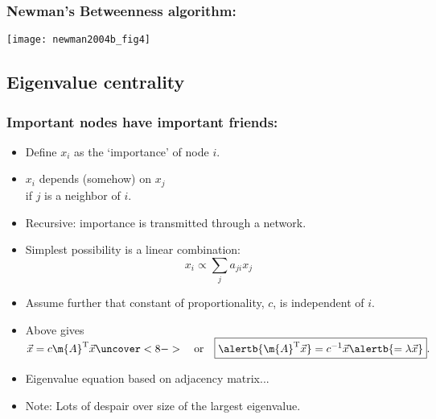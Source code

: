 \begin{frame}
  \frametitle{Newman's Betweenness algorithm:\cite{newman2001d}}

  \texttt{[image: newman2004b\_fig4]}
  
\end{frame}

\subsection{Eigenvalue centrality}

\begin{frame}
  \frametitle{Important nodes have important friends:}

  \begin{itemize}
  \item<2-> 
    Define $x_i$ as the `importance' of node $i$.
  \item<3-> 
     $x_i$ depends (somehow) on $x_j$\\
    \qquad if $j$ is a neighbor of $i$.
  \item<4-> 
    \alert{Recursive:} importance is transmitted
    through a network.
  \item<5-> 
    Simplest possibility is a linear combination:
    $$
    x_i \propto \sum_{j} a_{ji} x_j
    $$
  \item<6-> 
    Assume further that constant of proportionality, $c$,
    is independent of $i$.
  \item<7-> 
    Above gives 
    $
    \vec{x} = c \m{A}^{\textnormal{T}} \vec{x}
    \uncover<8->{
      \quad \textnormal{or} \quad
      \boxed{\alertb{\m{A}^{\textnormal{T}} \vec{x}} = c^{-1} \vec{x} \alertb{= \lambda \vec{x}}}.}
    $
  \item<9->
    Eigenvalue equation based on adjacency matrix...
  \item<10->
    Note: Lots of despair over size of the largest eigenvalue.\cite{wasserman1994a}
  \end{itemize}

\end{frame}


